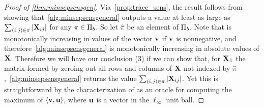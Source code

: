 \documentclass{article}
\begin{document}
\begin{proof}[Proof of \cref{thm:minsepsensgen}]Via~\cref{prop:trace_sens}, the result follows from showing that~\cref{alg:minsepsensgeneral} outputs a value at least as large as $\sum_{(i, j) \in \pi} |\mathbf{X}_{ij}|$ for any $\pi \in \Pi_{b}$. So let $\hat{\pi}$ be an element of $\Pi_{b}$. Note that \VecSens is monotonically increasing in values of the vector $\mathbf{v}$ if $\mathbf{v}$ is nonnegative, and therefore~\cref{alg:minsepsensgeneral} is monotonically increasing in absolute values of $\mathbf{X}$. Therefore we will have our conclusion (3) if we can show that, for $\mathbf{X}_{\hat{\pi}}$ the matrix formed by zeroing out all rows and columns of $\mathbf{X}$ not indexed by $\hat{\pi}$,~\cref{alg:minsepsensgeneral} returns the value $\sum_{(i, j) \in \pi} |\mathbf{X}_{ij}|$. Yet this is straightforward by the characterization of \VecSens as an oracle for computing the maximum of $\langle \mathbf{v}, \mathbf{u} \rangle$, where $\mathbf{u}$ is a vector in the $\ell_\infty$ unit ball.
\end{proof}
\end{document}
